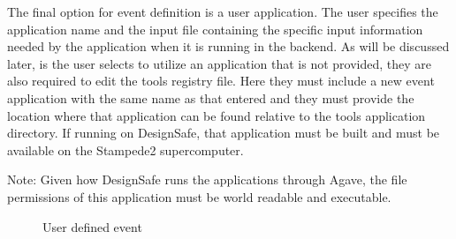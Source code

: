 The final option for event definition is a user application. 
The user specifies the application name and the input file containing the specific input information 
needed by the application when it is running in the backend. 
As will be discussed later, is the user selects to utilize an application that is not provided, they are also required to edit the tools registry file. Here they must include a new event application with the same name as that entered and they must provide the location where that application can be found relative to the tools application directory. 
If running on DesignSafe, that application must be built and must be available on the Stampede2 supercomputer. 

Note: Given how DesignSafe runs the applications through Agave, the file permissions of this application must be world readable and executable.

\begin{figure}[!htbp]
  \caption{User defined event}
  \label{fig:user_defined_event_panel}
\end{figure}
